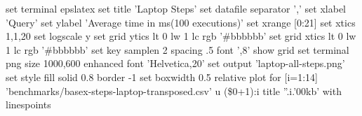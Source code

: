 
set terminal epslatex
set title 'Laptop Steps'
set datafile separator ','
set xlabel 'Query'
set ylabel 'Average time in ms(100 executions)'
set xrange [0:21]
set xtics 1,1,20
set logscale y
set grid ytics lt 0 lw 1 lc rgb '#bbbbbb'
set grid xtics lt 0 lw 1 lc rgb '#bbbbbb'
set key samplen 2 spacing .5 font ',8'
show grid
set terminal png size 1000,600 enhanced font 'Helvetica,20'
set output 'laptop-all-steps.png'
set style fill solid 0.8 border -1
set boxwidth 0.5 relative
plot for [i=1:14] 'benchmarks/basex-steps-laptop-transposed.csv' u (\$0+1):i title ''.i.'00kb' with linespoints

